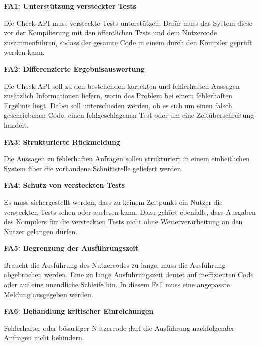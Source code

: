 \begin{description}
	\item \textbf{FA1: Unterstützung versteckter Tests}
	
	Die Check-API muss versteckte Tests unterstützen. Dafür muss das System diese vor der Kompilierung mit den öffentlichen Tests und dem Nutzercode zusammenführen, sodass der gesamte Code in einem durch den Kompiler geprüft werden kann.
		
	\item \textbf{FA2: Differenzierte Ergebnisauswertung}
	
	Die Check-API soll zu den bestehenden korrekten und fehlerhaften Aussagen zusätzlich Informationen liefern, worin das Problem bei einem fehlerhaften Ergebnis liegt. Dabei soll unterschieden werden, ob es sich um einen falsch geschriebenen Code, einen fehlgeschlagenen Test oder um eine Zeitüberschreitung handelt.
	
	\item \textbf{FA3: Strukturierte Rückmeldung}
	
	Die Aussagen zu fehlerhaften Anfragen sollen strukturiert in einem einheitlichen System über die vorhandene Schnittstelle geliefert werden.

	\item \textbf{FA4: Schutz von versteckten Tests}
	
	Es muss sichergestellt werden, dass zu keinem Zeitpunkt ein Nutzer die versteckten Tests sehen oder auslesen kann. Dazu gehört ebenfalls, dass Ausgaben des Kompilers für die versteckten Tests nicht ohne Weiterverarbeitung an den Nutzer gelangen dürfen.
		
	\item \textbf{FA5: Begrenzung der Ausführungszeit}
	
	Braucht die Ausführung des Nutzercodes zu lange, muss die Ausführung abgebrochen werden. Eine zu lange Ausführungszeit deutet auf ineffizienten Code oder auf eine unendliche Schleife hin. In diesem Fall muss eine angepasste Meldung ausgegeben werden.
	
	\item \textbf{FA6: Behandlung kritischer Einreichungen}
	
	Fehlerhafter oder bösartiger Nutzercode darf die Ausführung nachfolgender Anfragen nicht behindern.
	
\end{description}

